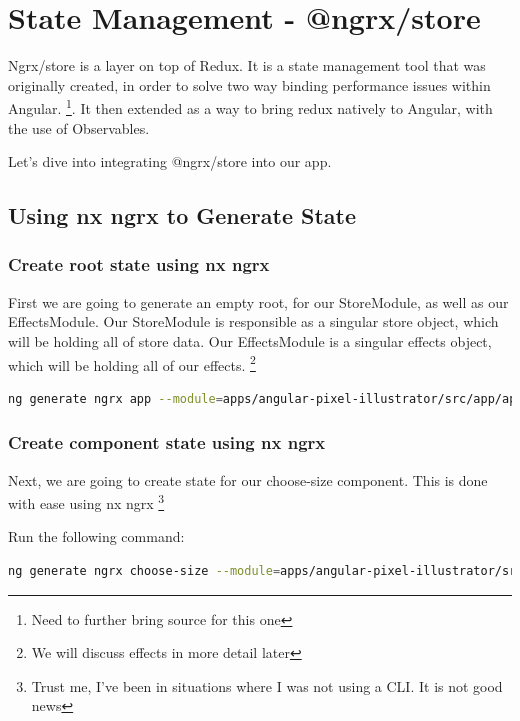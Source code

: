 
\chapter{ State Management - @ngrx/store }

Ngrx/store is a layer on top of Redux. It is a state management tool that was
originally created, in order to solve two way binding performance issues within
Angular. \footnote{Need to further bring source for this one}. It then extended
as a way to bring redux natively to Angular, with the use of Observables.

Let's dive into integrating @ngrx/store into our app. 

\section{ Using nx ngrx to Generate State }

\subsection{ Create root state using nx ngrx }

First we are going to generate an empty root, for our StoreModule, as well as
our EffectsModule. Our StoreModule is responsible as a singular store object,
which will be holding all of store data. Our EffectsModule is a singular effects
object, which will be holding all of our effects. \footnote{We will discuss
effects in more detail later}

\begin{lstlisting}[language=Bash]
ng generate ngrx app --module=apps/angular-pixel-illustrator/src/app/app.module.ts --onlyEmptyRoot
\end{lstlisting}

\subsection{ Create component state using nx ngrx }

Next, we are going to create state for our choose-size component. This is done
with ease using nx ngrx \footnote{Trust me, I've been in situations where I
was not using a CLI. It is not good news}

Run the following command:
\begin{lstlisting}[language=Bash]
ng generate ngrx choose-size --module=apps/angular-pixel-illustrator/src/app/components/choose-size/choose-size.module.ts
\end{lstlisting}

